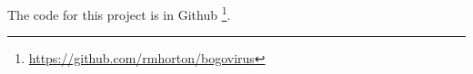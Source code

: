 \documentclass{article}
\begin{document}

The code for this project is in Github \footnote{\url{https://github.com/rmhorton/bogovirus}}.











\end{document}
